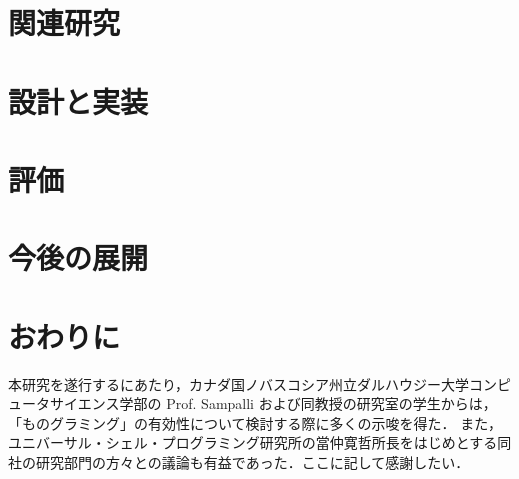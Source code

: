 \begin{comment}
3.関連研究（00%
\end{comment}
\section{関連研究}
\label{sec:03relatedworks}


\begin{comment}
4. 設計と実装（00%
\end{comment}
\section{設計と実装}
\label{sec:04design_and_implementation}


\begin{comment}
5. 評価
\end{comment}
\section{評価}
\label{sec:05evaluation}


\begin{comment}
6. 今後の展開（00%
\end{comment}
\section{今後の展開}
\label{sec:06nextstep}


\begin{comment}
7. おわりに（00%
\end{comment}
\section{おわりに}
\label{sec:07conclusion}

\begin{comment}
謝辞（100%
\end{comment}

\begin{acknowledgment}
  本研究を遂行するにあたり，カナダ国ノバスコシア州立ダルハウジー大学コンピュータサイエンス学部の Prof. Sampalli および同教授の研究室の学生からは，「ものグラミング」の有効性について検討する際に多くの示唆を得た．
  また，ユニバーサル・シェル・プログラミング研究所の當仲寛哲所長をはじめとする同社の研究部門の方々との議論も有益であった．ここに記して感謝したい．
\end{acknowledgment}

\newpage

